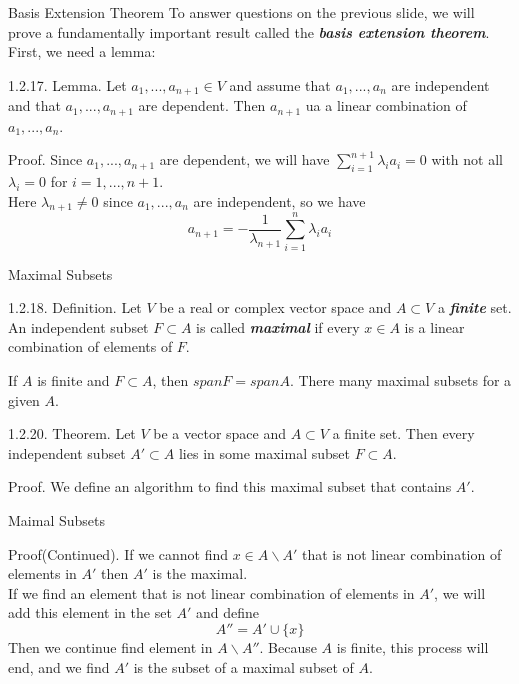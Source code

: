 \documentclass[hyperref={pdfpagelabels=true}]{beamer}
\newcommand{\highlightr}[1]{\textcolor[rgb]{1,0.3,0.2}{\emph{\textbf{#1}}}}
\newcommand{\highlightg}[1]{\textcolor[rgb]{0.1,0.5,0.3}{\emph{\textbf{#1}}}}
\newcommand{\<}{\langle}
\renewcommand{\>}{\rangle}
\begin{document}
\begin{frame}{Basis Extension Theorem}
    To answer questions on the previous slide, we will prove a fundamentally important result called the \highlightg{basis extension theorem}. First, we need a lemma:
    \begin{block}{1.2.17. Lemma.}
        Let $a_1,...,a_{n+1} \in V$ and assume that $a_1,...,a_n$ are independent and that $a_1,...,a_{n+1}$ are dependent. Then $a_{n+1}$ ua a linear combination of $a_{1},...,a_{n}$.
    \end{block}
    \begin{block}{Proof.}
        Since $a_{1},...,a_{n+1}$ are dependent, we will have $\sum_{i = 1}^{n+1}\lambda_{i}a_{i} = 0$ with not all $\lambda_{i} = 0$ for $i = 1,...,n+1$.\\
        Here $\lambda_{n+1} \neq 0$ since $a_1,...,a_n$ are independent, so we have 
        \[a_{n+1} = -\frac{1}{\lambda_{n+1}}{\sum_{i = 1}^{n}\lambda_{i}a_{i}}\]
    \end{block}
\end{frame}
\begin{frame}{Maximal Subsets}
    \begin{block}{1.2.18. Definition.}
        Let $V$ be a real or complex vector space and $A \subset V$ a \highlightr{finite} set. An independent subset $F \subset A$ is called \highlightg{maximal} if every $x \in A$ is a linear combination of elements of $F$.
    \end{block}
    If $A$ is finite and $F \subset A$, then $span F = span A$. There many maximal subsets for a given $A$.
    \begin{block}{1.2.20. Theorem.}
        Let $V$ be a vector space and $A \subset V$ a finite set. Then every independent subset $A' \subset A$ lies in some maximal subset $F \subset A$.
    \end{block}
    \begin{block}{Proof.}
        We define an algorithm to find this maximal subset that contains $A'$.
    \end{block} 
\end{frame}
\begin{frame}{Maimal Subsets}
    \begin{block}{Proof(Continued).}
        If we cannot find $x \in A \backslash A'$ that is not linear combination of elements in $A'$ then $A'$ is the maximal.\\
        If we find an element that is not linear combination of elements in $A'$, we will add this element in the set $A'$ and define
        \[A'' = A' \cup \{x\}\]
        Then we continue find element in $A \backslash A''$. Because $A$ is finite, this process will end, and we find $A'$ is the subset of a maximal subset of $A$. 
    \end{block}
\end{frame}
\end{document}
